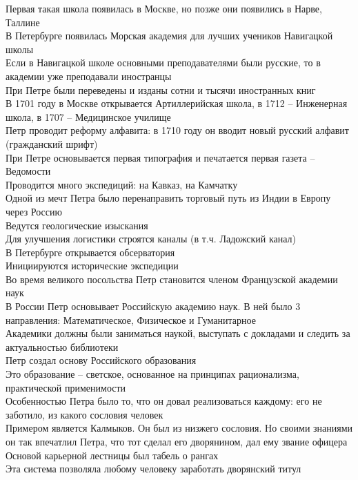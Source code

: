 \documentclass[12pt]{article}
\begin{document}
Первая такая школа появилась в Москве, но позже они появились в Нарве, Таллине\\
В Петербурге появилась Морская академия для лучших учеников Навигацкой школы\\
Если в Навигацкой школе основными преподавателями были русские, то в академии уже преподавали иностранцы\\
При Петре были переведены и изданы сотни и тысячи иностранных книг\\
В 1701 году в Москве открывается Артиллерийская школа, в 1712 -- Инженерная школа, в 1707 -- Медицинское училище\\
Петр проводит реформу алфавита: в 1710 году он вводит новый русский алфавит (гражданский шрифт)\\
При Петре основывается первая типография и печатается первая газета -- Ведомости\\
Проводится много экспедиций: на Кавказ, на Камчатку\\
Одной из мечт Петра было перенаправить торговый путь из Индии в Европу через Россию\\
Ведутся геологические изыскания\\
Для улучшения логистики строятся каналы (в т.ч. Ладожский канал)\\
В Петербурге открывается обсерватория\\
Инициируются исторические экспедиции\\
Во время великого посольства Петр становится членом Французской академии наук\\
В России Петр основывает Российскую академию наук. В ней было 3 направления: Математическое, Физическое и Гуманитарное\\
Академики должны были заниматься наукой, выступать с докладами и следить за актуальностью библиотеки\\
Петр создал основу Российского образования\\
Это образование -- светское, основанное на принципах рационализма, практической применимости\\
Особенностью Петра было то, что он довал реализоваться каждому: его не заботило, из какого сословия человек\\
Примером является Калмыков. Он был из низжего сословия. Но своими знаниями он так впечатлил Петра, что тот сделал его дворянином, дал ему звание офицера\\
Основой карьерной лестницы был табель о рангах\\
Эта система позволяла любому человеку заработать дворянский титул\\
\end{document}
